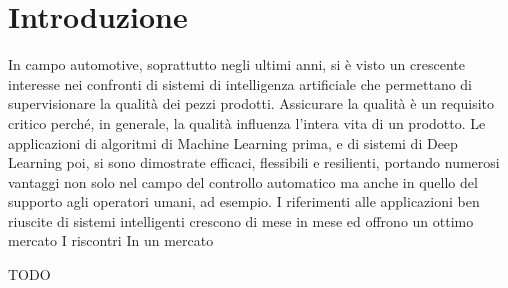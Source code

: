 
\chapter{Introduzione}

In campo automotive, soprattutto negli ultimi anni, si è visto un crescente interesse nei confronti di sistemi di intelligenza artificiale che permettano di supervisionare la qualità dei pezzi prodotti.
Assicurare la qualità è un requisito critico perché, in generale, la qualità influenza l'intera vita di un prodotto.
Le applicazioni di algoritmi di Machine Learning prima, e di sistemi di Deep Learning poi, si sono dimostrate efficaci, flessibili e resilienti, portando numerosi vantaggi non solo nel campo del controllo automatico ma anche in quello del supporto agli operatori umani, ad esempio.
I riferimenti alle applicazioni ben riuscite di sistemi intelligenti crescono di mese in mese ed offrono un ottimo mercato
I riscontri 
In un mercato 

TODO
